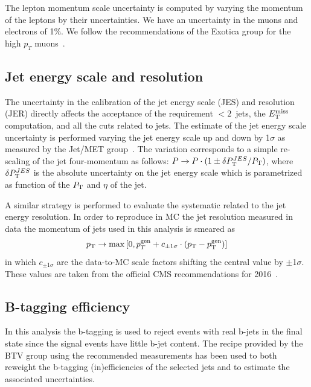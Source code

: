 The lepton momentum scale uncertainty is computed by varying the
momentum of the leptons by their uncertainties. We have an 
uncertainty in the muons and electrons of 1\%. We follow the recommendations of the Exotica group for the high $p_{T}$ muons~\cite{Twiki:EXO-MUODocumentationRun2}.

\subsection{Jet energy scale and resolution}

The uncertainty in the calibration of the jet energy scale (JES) and resolution (JER) 
directly affects the acceptance of the requirement $< 2$~jets, 
the $E_\mathrm{T}^{\mathrm{miss}}$ computation, and all the cuts related to jets. 
The estimate of the jet energy scale uncertainty is performed varying 
the jet energy scale up and down by 1$\sigma$ as
measured by the Jet/MET group~\cite{twiki:JES}. The variation
corresponds to a simple re-scaling of the jet four-momentum as
follows: $P\rightarrow P \cdot (1 \pm \delta P_\mathrm{T}^{JES}/{P_\mathrm{T}})$, where 
$\delta P_\mathrm{T}^{JES}$ is the absolute uncertainty on the jet energy scale
which is parametrized as function of the $P_\mathrm{T}$ and $\eta$ of the jet. 

A similar strategy is performed to evaluate the systematic related to
the jet energy resolution. In order to reproduce in MC the jet
resolution measured in data the momentum of jets used in this 
analysis is smeared as 
\begin{equation}
p_{\rm T} \rightarrow \max \left[0 , p_{T}^{\rm gen} + c_{\pm1\sigma}\cdot (p_{\rm T}-p_{\rm T}^{\rm gen}) \right]
\end{equation}
in which $c_{\pm1\sigma}$ are the data-to-MC scale factors 
shifting the central value by $\pm$1$\sigma$. These values are taken 
from the official CMS recommendations for 2016~\cite{twiki:JES}.

\subsection{B-tagging efficiency}

In this analysis the b-tagging is used to reject events with real b-jets in the final state since the signal events have little b-jet content. The recipe provided by the BTV group using the recommended measurements has been used to both reweight the b-tagging (in)efficiencies of the selected jets and to estimate 
the associated uncertainties.

